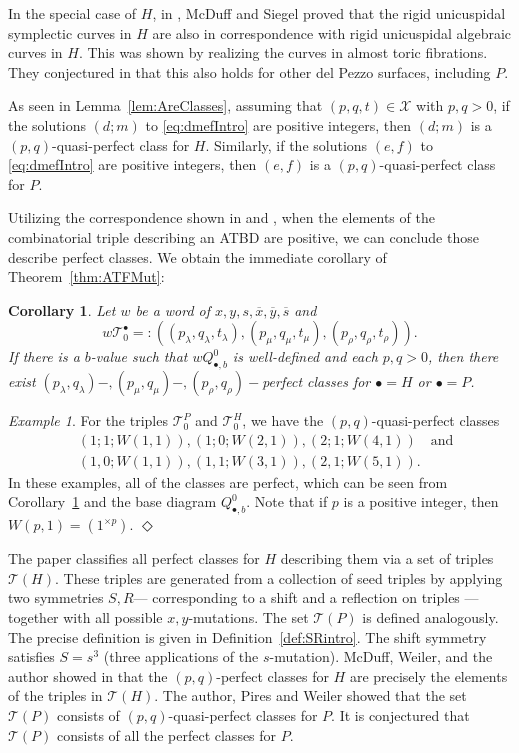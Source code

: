 \documentclass[11pt, reqno]{amsart}
\newtheorem{cor}[thm]{Corollary}
\theoremstyle{remark}
\numberwithin{equation}{subsection}
\numberwithin{figure}{section}
\theoremstyle{customremark}
\newtheorem{example_no_diamond}[thm]{Example}
\newenvironment{example}{\begin{example_no_diamond} } {\hfill$\er$ \end{example_no_diamond}}
\newcommand{\Tt}{\mathcal{T}}
\newcommand{\ov}{\overline}
\newcommand{\la}{{\lambda}}
\newcommand{\er}{{\Diamond}}
\newcommand{\T}{\mathcal{T}}
\begin{document}
In the special case of $H$, in \cite[Theorem F]{McSi}, McDuff and Siegel proved that the rigid unicuspidal symplectic curves in $H$ are also in correspondence with rigid unicuspidal algebraic curves in $H.$ This was shown by realizing the curves in almost toric fibrations. They conjectured in \cite[Conjecture G]{McSi} that this also holds for other del Pezzo surfaces, including $P.$

As seen in Lemma~\ref{lem:AreClasses}, assuming that $(p,q,t) \in \mathcal{X}$ with $p,q>0$, if the solutions $(d;m)$ to \eqref{eq:dmefIntro} are positive integers, then $(d;m)$ is a $(p,q)$-quasi-perfect class for $H$. Similarly, if the solutions $(e,f)$ to \eqref{eq:dmefIntro} are positive integers, then $(e,f)$ is a $(p,q)$-quasi-perfect class for $P.$ 

Utilizing the correspondence shown in \cite[Theorem D]{McSi} and \cite[Theorem G]{MS1}, when the elements of the combinatorial triple describing an ATBD are positive, we can conclude those describe perfect classes. We obtain the immediate corollary of Theorem~\ref{thm:ATFMut}:
\begin{cor} \label{cor:isPerfect}
    Let $w$ be a word of $x,y,s,\ov{x},\ov{y},\ov{s}$ and \[w\Tt_0^\bullet=:\left((p_\la,q_\la,t_\la),(p_\mu,q_\mu,t_\mu),(p_\rho,q_\rho,t_\rho)\right).\] If there is a $b$-value such that $wQ_{\bullet,b}^0$ is well-defined and each $p,q>0$, then
    there exist $(p_\la,q_\la)-,(p_\mu,q_\mu)-,(p_\rho,q_\rho)-$perfect classes for $\bullet=H$ or $\bullet=P$. 
\end{cor}

\begin{example} \label{ex:baseExceptional}
    For the triples $\Tt_0^P$ and $\Tt_0^H$, we have the $(p,q)$-quasi-perfect classes 
    \begin{align*}
      &(1;1;W(1,1)),(1;0;W(2,1)),(2;1;W(4,1)) \quad \text{and}\\  &(1,0;W(1,1)),(1,1;W(3,1)),(2,1;W(5,1)).
    \end{align*}
    In these examples, all of the classes are perfect, which can be seen from Corollary~\ref{cor:isPerfect} and the base diagram $Q_{\bullet,b}^0$. 
    Note that if $p$ is a positive integer, then $W(p,1)=(1^{\times p}).$
\end{example}

The paper \cite{MMW} classifies all perfect classes for $H$ describing them via a set of triples $\T(H)$.
These triples are generated from a collection of seed triples by applying two symmetries
$S,R$— corresponding to a shift and a reflection on triples — together with all possible $x,y$-mutations. The set $\T(P)$ is defined analogously. The precise definition is given in Definition~\ref{def:SRintro}. The shift symmetry satisfies $S = s^3$ (three applications of the $s$-mutation). McDuff, Weiler, and the author showed in \cite{MMW} that the $(p,q)$-perfect classes for $H$
are precisely the elements of the triples in $\T(H).$ The author, Pires and Weiler showed that the set $\T(P)$ consists of $(p,q)$-quasi-perfect classes for $P.$ It is conjectured that $\T(P)$ consists of all the perfect classes for $P.$
\end{document}
